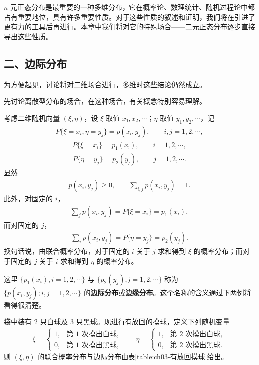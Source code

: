 \documentclass[../../main.tex]{subfiles}
\begin{document}
$n$ 元正态分布是最重要的一种多维分布，它在概率论、数理统计、随机过程论中都占有重要地位，具有许多重要性质。对于这些性质的叙述和证明，我们将在引进了更有力的工具后再进行。本章中我们将对它的特殊场合——二元正态分布逐步直接导出这些性质。

\subsection*{二、边际分布}

为方便起见，讨论将对二维场合进行，多维时这些结论仍然成立。

先讨论离散型分布的场合，在这种场合，有关概念特别容易理解。

考虑二维随机向量 $(\xi,\eta)$，设 $\xi$ 取值 $x_1,x_2,\cdots$；$\eta$ 取值 $y_1,y_2,\cdots$，记
\begin{align}
P\{\xi=x_i,\eta=y_j\}=p(x_i,y_j),\qquad i,j=1,2,\cdots,\label{align:ch03-二维联合概率}
\end{align}
\begin{align}
P\{\xi=x_i\}=p_1(x_i),\qquad i=1,2,\cdots,\label{align:ch03-二维边际概率xi}
\end{align}
\begin{align}
P\{\eta=y_j\}=p_2(y_j),\qquad j=1,2,\cdots.\label{align:ch03-二维边际概率eta}
\end{align}
显然
\begin{align}
p(x_i,y_j)\geqslant 0,\qquad \sum_{i,j}p(x_i,y_j)=1.\label{align:ch03-二维联合概率归一}
\end{align}
此外，对固定的 $i$，
\begin{align}
\sum_{j}p(x_i,y_j)=P\{\xi=x_i\}=p_1(x_i),\label{align:ch03-边际求和i}
\end{align}
而对固定的 $j$，
\begin{align}
\sum_{i}p(x_i,y_j)=P\{\eta=y_j\}=p_2(y_j).\label{align:ch03-边际求和j}
\end{align}
换句话说，由联合概率分布，对于固定的 $i$ 关于 $j$ 求和得到 $\xi$ 的概率分布；而对于固定的 $j$ 关于 $i$ 求和得到 $\eta$ 的概率分布。

这里 $\{p_1(x_i),i=1,2,\cdots\}$ 与 $\{p_2(y_j),j=1,2,\cdots\}$ 称为 $\{p(x_i,y_j);i,j=1,2,\cdots\}$ 的\textbf{边际分布}或\textbf{边缘分布}。这个名称的含义通过下两例将看得很清楚。

\begin{example}[有放回摸球]\label{example:ch03-有放回摸球}
袋中装有 $2$ 只白球及 $3$ 只黑球。现进行有放回的摸球，定义下列随机变量
\begin{align*}\xi=\begin{cases}1, & \text{第 }1\text{ 次摸出白球},\\ 0, & \text{第 }1\text{ 次摸出黑球},\end{cases}\qquad
\eta=\begin{cases}1, & \text{第 }2\text{ 次摸出白球},\\ 0, & \text{第 }2\text{ 次摸出黑球}.\end{cases}\end{align*}
则 $(\xi,\eta)$ 的联合概率分布与边际分布由表\ref{table:ch03-有放回摸球}给出。
\end{example}
\end{document}
